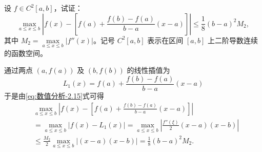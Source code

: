 \documentclass[../../main.tex]{subfiles}%
\begin{document}
\begin{example}
设 $f \in C^2[a, b]$，试证： 
\[
\max_{a \leqslant x \leqslant b} \left| f(x) - \left[ f(a) + \frac{f(b) - f(a)}{b - a}(x - a) \right] \right| \leqslant \frac{1}{8}(b - a)^2 M_2,
\]
其中 $M_2 = \max\limits_{a \leqslant x \leqslant b} |f''(x)|$。记号 $C^2[a, b]$ 表示在区间 $[a, b]$ 上二阶导数连续的函数空间。
\end{example}
\begin{solution}
通过两点 $(a, f(a))$ 及 $(b, f(b))$ 的线性插值为 
\[
L_1(x) = f(a) + \frac{f(b) - f(a)}{b - a}(x - a)
\]
于是由\eqref{eq:数值分析-2.15}式可得
\begin{align*}
&\max_{a \leqslant x \leqslant b} \left| f(x) - \left[ f(a) + \frac{f(b) - f(a)}{b - a}(x - a) \right] \right| \\
&= \max_{a \leqslant x \leqslant b} |f(x) - L_1(x)| = \max_{a \leqslant x \leqslant b} \left| \frac{f''(\xi)}{2}(x - a)(x - b) \right| \\
&\leqslant \frac{M_2}{2} \max_{a \leqslant x \leqslant b} |(x - a)(x - b)| = \frac{1}{8}(b - a)^2 M_2.
\end{align*}

\end{solution}
\end{document}
